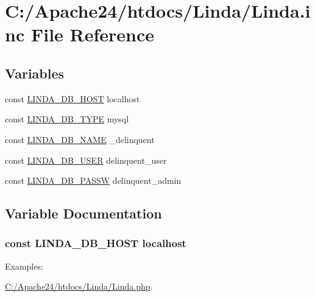 \hypertarget{_linda_8inc}{}\section{C\+:/\+Apache24/htdocs/\+Linda/\+Linda.inc File Reference}
\label{_linda_8inc}
\subsection*{Variables}
\begin{DoxyCompactItemize}
\item 
const \hyperlink{_linda_8inc_a86b40c589d474db371ea58296a5eeb12}{L\+I\+N\+D\+A\+\_\+\+D\+B\+\_\+\+H\+O\+S\+T} \textquotesingle{}localhost\textquotesingle{}
\item 
const \hyperlink{_linda_8inc_a75c0048bcb27b8bf9d4e9fd1b9eb023b}{L\+I\+N\+D\+A\+\_\+\+D\+B\+\_\+\+T\+Y\+P\+E} \textquotesingle{}mysql\textquotesingle{}
\item 
const \hyperlink{_linda_8inc_a4e480c562d1f6701e89f603607ddbb54}{L\+I\+N\+D\+A\+\_\+\+D\+B\+\_\+\+N\+A\+M\+E} \textquotesingle{}\+\_\+delinquent\textquotesingle{}
\item 
const \hyperlink{_linda_8inc_a713707c7fea371f7f3892136c1e852f0}{L\+I\+N\+D\+A\+\_\+\+D\+B\+\_\+\+U\+S\+E\+R} \textquotesingle{}delinquent\+\_\+user\textquotesingle{}
\item 
const \hyperlink{_linda_8inc_aef9b254dff90502b875151a93b462df1}{L\+I\+N\+D\+A\+\_\+\+D\+B\+\_\+\+P\+A\+S\+S\+W} \textquotesingle{}delinquent\+\_\+admin\textquotesingle{}
\end{DoxyCompactItemize}


\subsection{Variable Documentation}
\hypertarget{_linda_8inc_a86b40c589d474db371ea58296a5eeb12}{}
\subsubsection[{L\+I\+N\+D\+A\+\_\+\+D\+B\+\_\+\+H\+O\+S\+T}]{\setlength{\rightskip}{0pt plus 5cm}const L\+I\+N\+D\+A\+\_\+\+D\+B\+\_\+\+H\+O\+S\+T \textquotesingle{}localhost\textquotesingle{}}\label{_linda_8inc_a86b40c589d474db371ea58296a5eeb12}
\begin{Desc}
\item[Examples\+: ]\par
\hyperlink{_c_1_2_apache24_2htdocs_2_linda_2_linda_8php-example}{C\+:/\+Apache24/htdocs/\+Linda/\+Linda.\+php}.\end{Desc}


